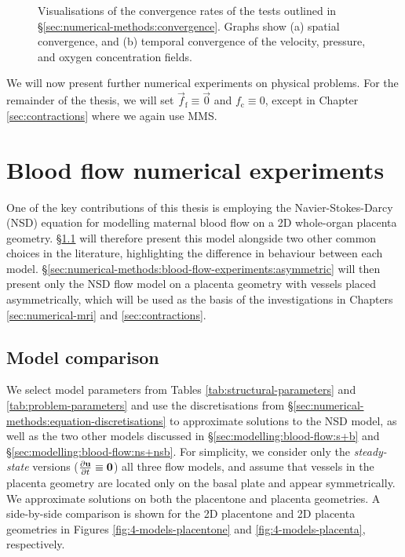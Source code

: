 \begin{figure}
\begin{subfigure}{0.45\textwidth}
                \caption{}
                \label{fig:mms-convergence:time}
            \end{subfigure}
            \caption{Visualisations of the convergence rates of the tests outlined in \S\ref{sec:numerical-methods:convergence}. Graphs show (a) spatial convergence, and (b) temporal convergence of the velocity, pressure, and oxygen concentration fields.}
            \label{fig:mms-convergence}
        \end{figure}

        We will now present further numerical experiments on physical problems. For the remainder of the thesis, we will set $\vec{f}_\text{f} \equiv \vec{0}$ and $f_\text{c} \equiv 0$, except in Chapter \ref{sec:contractions} where we again use MMS.
    
    \section{Blood flow numerical experiments} \label{sec:numerical-methods:blood-flow-experiments}    
        One of the key contributions of this thesis is employing the Navier-Stokes-Darcy (NSD) equation for modelling maternal blood flow on a 2D whole-organ placenta geometry. \S\ref{sec:numerical-methods:blood-flow-experiments:comparison} will therefore present this model alongside two other common choices in the literature, highlighting the difference in behaviour between each model. \S\ref{sec:numerical-methods:blood-flow-experiments:asymmetric} will then present only the NSD flow model on a placenta geometry with vessels placed asymmetrically, which will be used as the basis of the investigations in Chapters \ref{sec:numerical-mri} and \ref{sec:contractions}.

        \subsection{Model comparison} \label{sec:numerical-methods:blood-flow-experiments:comparison}
        
            We select model parameters from Tables \ref{tab:structural-parameters} and \ref{tab:problem-parameters} and use the discretisations from \S\ref{sec:numerical-methods:equation-discretisations} to approximate solutions to the NSD model, as well as the two other models discussed in \S\ref{sec:modelling:blood-flow:s+b} and \S\ref{sec:modelling:blood-flow:ns+nsb}. For simplicity, we consider only the \textit{steady-state} versions ($\pdv{\boldsymbol{\mathbf{u}}}{t} \equiv \boldsymbol{\mathbf{0}}$) all three flow models, and assume that vessels in the placenta geometry are located only on the basal plate and appear symmetrically. We approximate solutions on both the placentone and placenta geometries. A side-by-side comparison is shown for the 2D placentone and 2D placenta geometries in Figures \ref{fig:4-models-placentone} and \ref{fig:4-models-placenta}, respectively.

